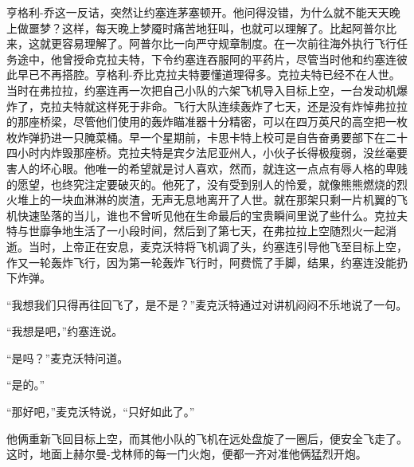     亨格利-乔这一反诘，突然让约塞连茅塞顿开。他问得没错，为什么就不能天天晚上做噩梦？这样，每天晚上梦魇时痛苦地狂叫，也就可以理解了。比起阿普尔比来，这就更容易理解了。阿普尔比一向严守规章制度。在一次前往海外执行飞行任务途中，他曾授命克拉夫特，下令约塞连吞服阿的平药片，尽管当时他和约塞连彼此早已不再搭腔。亨格利-乔比克拉夫特要懂道理得多。克拉夫特已经不在人世。当时在弗拉拉，约塞连再一次把自己小队的六架飞机导入目标上空，一台发动机爆炸了，克拉夫特就这样死于非命。飞行大队连续轰炸了七天，还是没有炸悼弗拉拉的那座桥梁，尽管他们使用的轰炸瞄准器十分精密，可以在四万英尺的高空把一枚枚炸弹扔进一只腌菜桶。早一个星期前，卡思卡特上校可是自告奋勇要部下在二十四小时内炸毁那座桥。克拉夫特是宾夕法尼亚州人，小伙子长得极瘦弱，没丝毫要害人的坏心眼。他唯一的希望就是讨人喜欢，然而，就连这一点点有辱人格的卑贱的愿望，也终究注定要破灭的。他死了，没有受到别人的怜爱，就像熊熊燃烧的烈火堆上的一块血淋淋的炭渣，无声无息地离开了人世。就在那架只剩一片机翼的飞机快速坠落的当儿，谁也不曾听见他在生命最后的宝贵瞬间里说了些什么。克拉夫特与世靡争地生活了一小段时间，然后到了第七天，在弗拉拉上空随烈火一起消逝。当时，上帝正在安息，麦克沃特将飞机调了头，约塞连引导他飞至目标上空，作又一轮轰炸飞行，因为第一轮轰炸飞行时，阿费慌了手脚，结果，约塞连没能扔下炸弹。

    “我想我们只得再往回飞了，是不是？”麦克沃特通过对讲机闷闷不乐地说了一句。

    “我想是吧，”约塞连说。

    “是吗？”麦克沃特问道。

    “是的。”

    “那好吧，”麦克沃特说，“只好如此了。”

    他俩重新飞回目标上空，而其他小队的飞机在远处盘旋了一圈后，便安全飞走了。这时，地面上赫尔曼-戈林师的每一门火炮，便都一齐对准他俩猛烈开炮。

